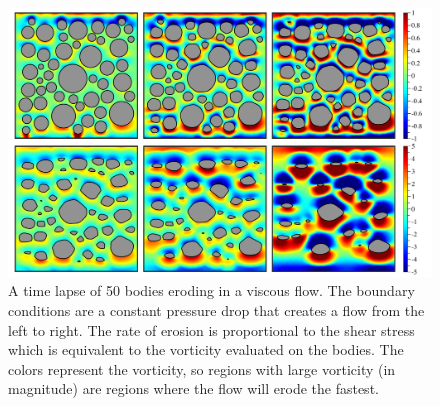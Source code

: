 \documentclass[preprint, 10pt]{elsarticle}
\begin{document}

\begin{figure}%
\begin{center}
\includegraphics[width = 0.80 \textwidth]{./figs/50bod.pdf}
\caption{\label{fig:50bodies} A time lapse of 50 bodies eroding in a viscous flow.  The boundary conditions are a constant pressure drop that creates a flow from the left to right.  The rate of erosion is proportional to the shear stress which is equivalent to the vorticity evaluated on the bodies.  The colors represent the vorticity, so regions with large vorticity (in magnitude) are regions where the flow will erode the fastest.}
\end{center}
\end{figure}



\end{document}
